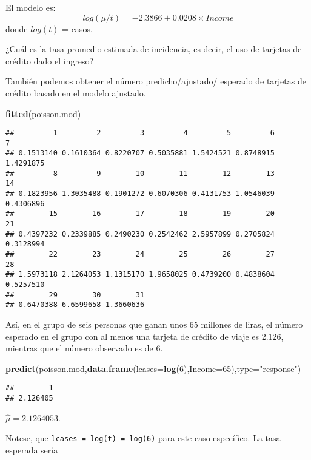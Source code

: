 \documentclass[]{article}
\newenvironment{Shaded}{\begin{snugshade}}{\end{snugshade}}
\newcommand{\KeywordTok}[1]{\textcolor[rgb]{0.13,0.29,0.53}{\textbf{{#1}}}}
\newcommand{\DataTypeTok}[1]{\textcolor[rgb]{0.13,0.29,0.53}{{#1}}}
\newcommand{\DecValTok}[1]{\textcolor[rgb]{0.00,0.00,0.81}{{#1}}}
\newcommand{\StringTok}[1]{\textcolor[rgb]{0.31,0.60,0.02}{{#1}}}
\newcommand{\NormalTok}[1]{{#1}}
\numberwithin{equation}{section}
\begin{document}
El modelo es: \[
log(\mu/t) = -2.3866 + 0.0208 × Income
\] donde \(log(t)\) = casos.

¿Cuál es la tasa promedio estimada de incidencia, es decir, el uso de
tarjetas de crédito dado el ingreso?

También podemos obtener el número predicho/ajustado/ esperado de
tarjetas de crédito basado en el modelo ajustado.

\begin{Shaded}
\begin{Highlighting}[]
\KeywordTok{fitted}\NormalTok{(poisson.mod)}
\end{Highlighting}
\end{Shaded}

\begin{verbatim}
##         1         2         3         4         5         6         7 
## 0.1513140 0.1610364 0.8220707 0.5035881 1.5424521 0.8748915 1.4291875 
##         8         9        10        11        12        13        14 
## 0.1823956 1.3035488 0.1901272 0.6070306 0.4131753 1.0546039 0.4306896 
##        15        16        17        18        19        20        21 
## 0.4397232 0.2339885 0.2490230 0.2542462 2.5957899 0.2705824 0.3128994 
##        22        23        24        25        26        27        28 
## 1.5973118 2.1264053 1.1315170 1.9658025 0.4739200 0.4838604 0.5257510 
##        29        30        31 
## 0.6470388 6.6599658 1.3660636
\end{verbatim}

Así, en el grupo de seis personas que ganan unos 65 millones de liras,
el número esperado en el grupo con al menos una tarjeta de crédito de
viaje es 2.126, mientras que el número observado es de 6.

\begin{Shaded}
\begin{Highlighting}[]
\KeywordTok{predict}\NormalTok{(poisson.mod,}\KeywordTok{data.frame}\NormalTok{(}\DataTypeTok{lcases=}\KeywordTok{log}\NormalTok{(}\DecValTok{6}\NormalTok{),}\DataTypeTok{Income=}\DecValTok{65}\NormalTok{),}\DataTypeTok{type=}\StringTok{"response"}\NormalTok{)}
\end{Highlighting}
\end{Shaded}

\begin{verbatim}
##        1 
## 2.126405
\end{verbatim}

\(\hat{\mu}=2.1264053\).

Notese, que \texttt{lcases\ =\ log(t)\ =\ log(6)} para este caso
específico. La tasa esperada sería
\end{document}
